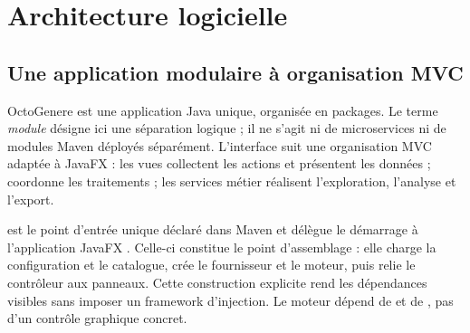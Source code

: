 \section{Architecture logicielle}
\label{sec:architecture}
\subsection{Une application modulaire à organisation MVC}
OctoGenere est une application Java unique, organisée en packages. Le terme \emph{module} désigne ici une séparation logique ; il ne s'agit ni de microservices ni de modules Maven déployés séparément. L'interface suit une organisation MVC adaptée à JavaFX : les vues collectent les actions et présentent les données ;  coordonne les traitements ; les services métier réalisent l'exploration, l'analyse et l'export.

 est le point d'entrée unique déclaré dans Maven et délègue le démarrage à l'application JavaFX . Celle-ci constitue le point d'assemblage : elle charge la configuration et le catalogue, crée le fournisseur et le moteur, puis relie le contrôleur aux panneaux. Cette construction explicite rend les dépendances visibles sans imposer un framework d'injection. Le moteur dépend de  et de , pas d'un contrôle graphique concret.

